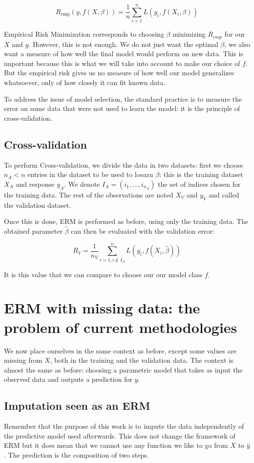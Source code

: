 \documentclass[12pt, a4paper]{memoir}
\begin{document}
$$ R_{\text{emp}}(y, f(X, \beta)) = \frac{1}{n} \sum\limits_{i=1}^n L(y_i, f(X_i, \beta))$$

Empirical Risk Minimization corresponds to choosing $\beta$ minimizing $R_{emp}$ for our $X$ and $y$. However, this is not enough. We do not just want the optimal $\beta$, we also want a measure of how well the final model would perform on new data. This is important because this is what we will take into account to make our choice of $f$. But the empirical risk gives us no measure of how well our model generalizes whatsoever, only of how closely it can fit known data.

To address the issue of model selection, the standard practice is to measure the error on some data that were not used to learn the model: it is the principle of cross-validation.

		\subsection{Cross-validation}
To perform Cross-validation, we divide the data in two datasets: first we choose $n_A < n$ entries in the dataset to be used to loearn $\beta$: this is the training dataset $X_A$ and response $y_A$. We denote $I_A = (i_1, \ldots, i_{n_A})$ the set of indices chosen for the training data. The rest of the observations are noted $X_V$ and $y_V$ and called the validation dataset.

Once this is done, ERM is performed as before, using only the training data. The obtained parameter $\hat{\beta}$ can then be evaluated with the validation error:

$$ R_{V} = \frac{1}{n_V} \sum\limits_{i=1, i \notin I_A}^n L(y_i, f(X_i, \hat{\beta}))$$

It is this value that we can compare to choose our our model class $f$.

	\section{ERM with missing data: the problem of current methodologies}
We now place ourselves in the same context as before, except some values are missing from $X$, both in the training and the validation data. The context is almost the same as before: choosing a parametric model that takes as input the observed data and outputs a prediction for $y$.
		\subsection{Imputation seen as an ERM}
Remember that the purpose of this work is to impute the data independently of the predictive model used afterwards. This does not change the framework of ERM but it does mean that we cannot use any function we like to go from $X$ to $\hat{y}$. The prediction is the composition of two steps.
\end{document}
